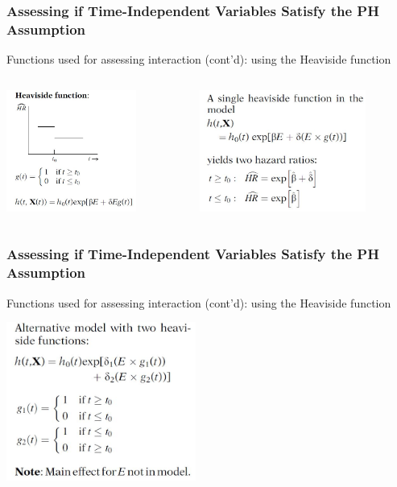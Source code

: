 \documentclass{beamer}
\theoremstyle{definition}
\begin{document}
\begin{frame}
\frametitle{Assessing if Time-Independent Variables Satisfy the PH Assumption}
\begin{block}{Functions used for assessing interaction (cont'd): using the Heaviside function}
\begin{columns}
    \begin{column}{0.48\textwidth}
        \includegraphics[width =\textwidth, height=4cm]{CH6_HeSi.JPG}
    \end{column}
    \hspace{-10pt}
    \begin{column}{0.48\textwidth}
         \includegraphics[width =\textwidth, height=4cm]{CH6_HeSi2.JPG}
    \end{column}
\end{columns} 
\end{block}
\end{frame}

\begin{frame}
\frametitle{Assessing if Time-Independent Variables Satisfy the PH Assumption}
\begin{block}{Functions used for assessing interaction (cont'd): using the Heaviside function}
\vspace{-20pt} 
\begin{center}
\includegraphics[width =\textwidth, height=5.2cm]{CH6_HeSi3.JPG}
\end{center} 
\end{block} 
\end{frame}
\end{document}
